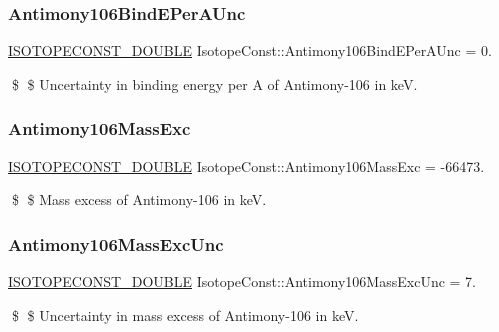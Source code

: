 \subsubsection{\texorpdfstring{Antimony106\+Bind\+E\+Per\+A\+Unc}{Antimony106BindEPerAUnc}}
{\footnotesize\ttfamily \mbox{\hyperlink{group___isotope_const-_macros_ga8f45a7272ce02c0b4c65c44636ed719a}{I\+S\+O\+T\+O\+P\+E\+C\+O\+N\+S\+T\+\_\+\+D\+O\+U\+B\+LE}} Isotope\+Const\+::\+Antimony106\+Bind\+E\+Per\+A\+Unc = 0.}

\$ \$ Uncertainty in binding energy per A of Antimony-\/106 in keV. \mbox{\label{group___isotope_const-_antimony-_sb106_gafcbf9d06cbb157f60afea73b471471d5}} 
\subsubsection{\texorpdfstring{Antimony106\+Mass\+Exc}{Antimony106MassExc}}
{\footnotesize\ttfamily \mbox{\hyperlink{group___isotope_const-_macros_ga8f45a7272ce02c0b4c65c44636ed719a}{I\+S\+O\+T\+O\+P\+E\+C\+O\+N\+S\+T\+\_\+\+D\+O\+U\+B\+LE}} Isotope\+Const\+::\+Antimony106\+Mass\+Exc = -\/66473.}

\$ \$ Mass excess of Antimony-\/106 in keV. \mbox{\label{group___isotope_const-_antimony-_sb106_ga446904d2ef3d36702e45bc381988d8bd}} 
\subsubsection{\texorpdfstring{Antimony106\+Mass\+Exc\+Unc}{Antimony106MassExcUnc}}
{\footnotesize\ttfamily \mbox{\hyperlink{group___isotope_const-_macros_ga8f45a7272ce02c0b4c65c44636ed719a}{I\+S\+O\+T\+O\+P\+E\+C\+O\+N\+S\+T\+\_\+\+D\+O\+U\+B\+LE}} Isotope\+Const\+::\+Antimony106\+Mass\+Exc\+Unc = 7.}

\$ \$ Uncertainty in mass excess of Antimony-\/106 in keV. \mbox{\label{group___isotope_const-_antimony-_sb106_gaf44fa0c285cda8fc46fbfe002dd03cb5}} 

